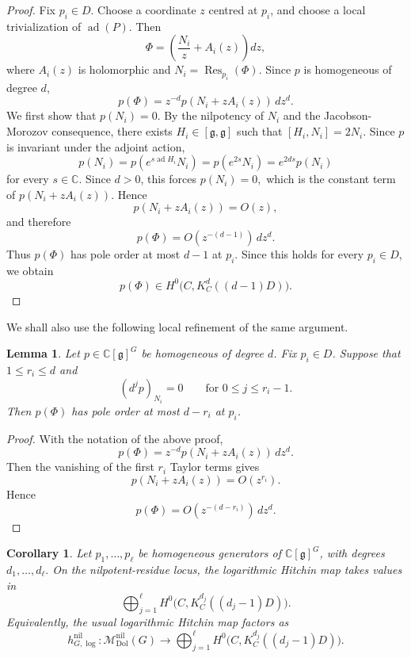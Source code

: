 \documentclass[11pt,reqno]{amsart}
\numberwithin{equation}{section}
\theoremstyle{plain}
\newtheorem{lemma}[theorem]{Lemma}
\newtheorem{corollary}[theorem]{Corollary}
\theoremstyle{definition}
\theoremstyle{remark}
\begin{document}
\begin{proof}
Fix \(p_i\in D\).  Choose a coordinate \(z\) centred at \(p_i\), and choose a
local trivialization of \(\operatorname{ad}(P)\).  Then
\[
        \Phi=
        \left(
        \frac{N_i}{z}+A_i(z)
        \right)dz,
\]
where \(A_i(z)\) is holomorphic and
\(
        N_i=\operatorname{Res}_{p_i}(\Phi).
\)
Since \(p\) is homogeneous of degree \(d\),
\[
        p(\Phi)
        =
        z^{-d}p(N_i+zA_i(z))\,dz^d.
\]
We first show that
\(
        p(N_i)=0.
\)
By the nilpotency of \(N_i\) and the Jacobson-Morozov consequence, there exists
\(
        H_i\in[\mathfrak g,\mathfrak g]
\)
such that
\(
        [H_i,N_i]=2N_i.
\)
Since \(p\) is invariant under the adjoint action,
\[
        p(N_i)
        =
        p(e^{s\operatorname{ad}H_i}N_i)
        =
        p(e^{2s}N_i)
        =
        e^{2ds}p(N_i)
\]
for every \(s\in\mathbb C\).  Since \(d>0\), this forces
\(
        p(N_i)=0,
\)
which is the constant term of
\(
        p(N_i+zA_i(z)).
\)
Hence
\[
        p(N_i+zA_i(z))=O(z),
\]
and therefore
\[
        p(\Phi)=O(z^{-(d-1)})\,dz^d.
\]
Thus \(p(\Phi)\) has pole order at most \(d-1\) at \(p_i\).  Since this holds
for every \(p_i\in D\), we obtain
\[
        p(\Phi)\in H^0\bigl(C,K_C^d((d-1)D)\bigr).
\]
\end{proof}

We shall also use the following local refinement of the same argument.

\begin{lemma}
\label{lem:refined-pole}
Let \(p\in\mathbb C[\mathfrak g]^G\) be homogeneous of degree \(d\). Fix
\(p_i\in D\). Suppose that \(1\leq r_i\leq d\) and 
\[
        (d^j p)_{N_i}=0
        \qquad
        \text{for }0\leq j\leq r_i-1.
\]
Then \(p(\Phi)\) has pole order at most \(d-r_i\) at \(p_i\).
\end{lemma}

\begin{proof}
With the notation of the above proof,
\[
        p(\Phi)
        =
        z^{-d}p(N_i+zA_i(z))\,dz^d.
\]
Then the vanishing of the first \(r_i\) Taylor terms gives
\[
        p(N_i+zA_i(z))=O(z^{r_i}).
\]
Hence
\[
        p(\Phi)=O(z^{-(d-r_i)})\,dz^d.
\]
\end{proof}


\begin{corollary}
\label{cor:nilpotent-hitchin-map}
Let
\(
        p_1,\ldots,p_\ell
\)
be homogeneous generators of \(\mathbb C[\mathfrak g]^G\), with degrees
\(
        d_1,\ldots,d_\ell.
\)
On the nilpotent-residue locus, the logarithmic Hitchin map takes values in
\[
        \bigoplus_{j=1}^{\ell}
        H^0\bigl(C,K_C^{d_j}((d_j-1)D)\bigr).
\]
Equivalently, the usual logarithmic Hitchin map factors as
\[
        h_{G,\log}^{\mathrm{nil}}:
        \mathcal M_{\mathrm{Dol}}^{\mathrm{nil}}(G)
        \longrightarrow
        \bigoplus_{j=1}^{\ell}
        H^0\bigl(C,K_C^{d_j}((d_j-1)D)\bigr).
\]
\end{corollary}
\end{document}
